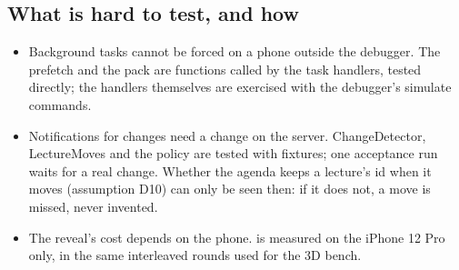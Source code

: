 \subsection{What is hard to test, and how}
\begin{itemize}
  \item Background tasks cannot be forced on a phone outside the debugger. The prefetch and the pack are functions called by the task handlers, tested directly; the handlers themselves are exercised with the debugger's simulate commands.
  \item Notifications for changes need a change on the server. ChangeDetector, LectureMoves and the policy are tested with fixtures; one acceptance run waits for a real change. Whether the agenda keeps a lecture's id when it moves (assumption D10) can only be seen then: if it does not, a move is missed, never invented.
  \item The reveal's cost depends on the phone.  is measured on the iPhone 12 Pro only, in the same interleaved rounds used for the 3D bench.
\end{itemize}
